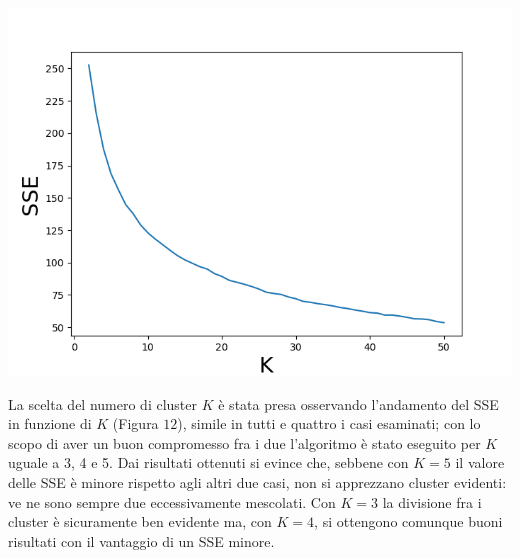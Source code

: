 \documentclass[english]{article}
\begin{document}
\begin{center}
\includegraphics[scale=0.6]{SSEsub1.png}
\end{center}

La scelta del numero di cluster $K$ è stata presa osservando l'andamento del SSE in funzione di $K$ (Figura $12$), simile in tutti e quattro i casi esaminati; con lo scopo di aver un buon compromesso fra i due l'algoritmo è stato eseguito per $K$ uguale a 3, 4 e 5. Dai risultati ottenuti si evince che, sebbene con $K=5$ il valore delle SSE è minore rispetto agli altri due casi, non si apprezzano cluster evidenti: ve ne sono sempre due eccessivamente mescolati. Con $K=3$ la divisione fra i cluster è sicuramente ben evidente ma, con $K=4$, si ottengono comunque buoni risultati con il vantaggio di un SSE minore.  
\end{document}
